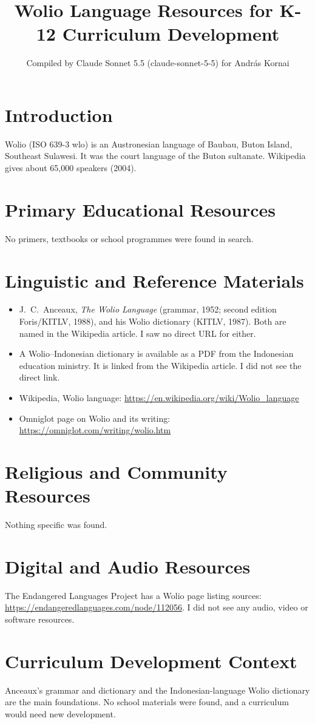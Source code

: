 \documentclass[12pt]{article}
\title{Wolio Language Resources for K-12 Curriculum Development}
\author{Compiled by Claude Sonnet 5.5 (claude-sonnet-5-5) for Andr\'as Kornai}
\date{}
\begin{document}
\maketitle

\section{Introduction}
Wolio (ISO 639-3 wlo) is an Austronesian language of Baubau, Buton Island, Southeast Sulawesi. It was the court language of the Buton sultanate. Wikipedia gives about 65,000 speakers (2004).

\section{Primary Educational Resources}
No primers, textbooks or school programmes were found in search.

\section{Linguistic and Reference Materials}
\begin{itemize}
\item J.\ C.\ Anceaux, \emph{The Wolio Language} (grammar, 1952; second edition Foris/KITLV, 1988), and his Wolio dictionary (KITLV, 1987). Both are named in the Wikipedia article. I saw no direct URL for either.
\item A Wolio--Indonesian dictionary is available as a PDF from the Indonesian education ministry. It is linked from the Wikipedia article. I did not see the direct link.
\item Wikipedia, Wolio language: \url{https://en.wikipedia.org/wiki/Wolio_language}
\item Omniglot page on Wolio and its writing: \url{https://omniglot.com/writing/wolio.htm}
\end{itemize}

\section{Religious and Community Resources}
Nothing specific was found.

\section{Digital and Audio Resources}
The Endangered Languages Project has a Wolio page listing sources: \url{https://endangeredlanguages.com/node/112056}. I did not see any audio, video or software resources.

\section{Curriculum Development Context}
Anceaux's grammar and dictionary and the Indonesian-language Wolio dictionary are the main foundations. No school materials were found, and a curriculum would need new development.
\end{document}
